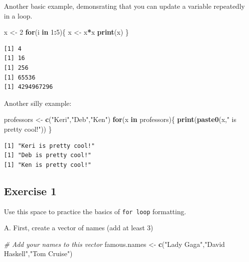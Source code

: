 \documentclass[
]{book}
\newenvironment{Shaded}{\begin{snugshade}}{\end{snugshade}}
\newcommand{\CommentTok}[1]{\textcolor[rgb]{0.56,0.35,0.01}{\textit{#1}}}
\newcommand{\ControlFlowTok}[1]{\textcolor[rgb]{0.13,0.29,0.53}{\textbf{#1}}}
\newcommand{\DecValTok}[1]{\textcolor[rgb]{0.00,0.00,0.81}{#1}}
\newcommand{\KeywordTok}[1]{\textcolor[rgb]{0.13,0.29,0.53}{\textbf{#1}}}
\newcommand{\NormalTok}[1]{#1}
\newcommand{\OperatorTok}[1]{\textcolor[rgb]{0.81,0.36,0.00}{\textbf{#1}}}
\newcommand{\StringTok}[1]{\textcolor[rgb]{0.31,0.60,0.02}{#1}}
\begin{document}
Another basic example, demonsrating that you can update a variable repeatedly in a loop.

\begin{Shaded}
\begin{Highlighting}[]
\NormalTok{x <-}\StringTok{ }\DecValTok{2}
\ControlFlowTok{for}\NormalTok{(i }\ControlFlowTok{in} \DecValTok{1}\OperatorTok{:}\DecValTok{5}\NormalTok{)\{}
\NormalTok{  x <-}\StringTok{ }\NormalTok{x}\OperatorTok{*}\NormalTok{x}
  \KeywordTok{print}\NormalTok{(x)}
\NormalTok{\}}
\end{Highlighting}
\end{Shaded}

\begin{verbatim}
[1] 4
[1] 16
[1] 256
[1] 65536
[1] 4294967296
\end{verbatim}

Another silly example:

\begin{Shaded}
\begin{Highlighting}[]
\NormalTok{professors <-}\StringTok{ }\KeywordTok{c}\NormalTok{(}\StringTok{"Keri"}\NormalTok{,}\StringTok{"Deb"}\NormalTok{,}\StringTok{"Ken"}\NormalTok{) }
\ControlFlowTok{for}\NormalTok{(x }\ControlFlowTok{in}\NormalTok{ professors)\{}
  \KeywordTok{print}\NormalTok{(}\KeywordTok{paste0}\NormalTok{(x,}\StringTok{" is pretty cool!"}\NormalTok{))}
\NormalTok{\}}
\end{Highlighting}
\end{Shaded}

\begin{verbatim}
[1] "Keri is pretty cool!"
[1] "Deb is pretty cool!"
[1] "Ken is pretty cool!"
\end{verbatim}

\hypertarget{exercise-1-6}{%
\subsection*{Exercise 1}\label{exercise-1-6}}

Use this space to practice the basics of \texttt{for\ loop} formatting.

A. First, create a vector of names (add at least 3)

\begin{Shaded}
\begin{Highlighting}[]
\CommentTok{# Add your names to this vector}
\NormalTok{famous.names <-}\StringTok{ }\KeywordTok{c}\NormalTok{(}\StringTok{"Lady Gaga"}\NormalTok{,}\StringTok{"David Haskell"}\NormalTok{,}\StringTok{"Tom Cruise"}\NormalTok{)}
\end{Highlighting}
\end{Shaded}
\end{document}
